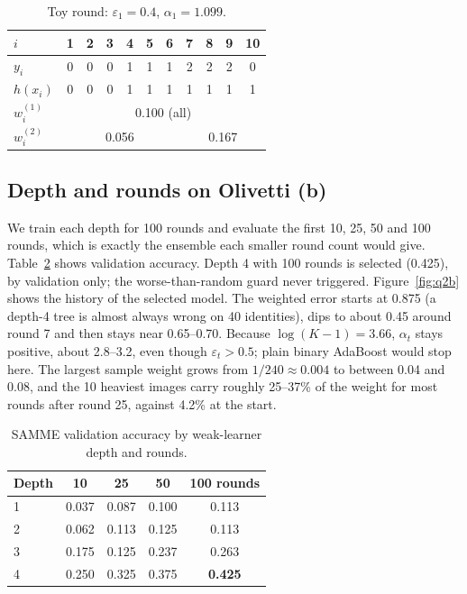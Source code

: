 \documentclass[10pt,twocolumn,letterpaper]{article}
\begin{document}
\begin{table}[t]
\centering\small
\setlength{\tabcolsep}{3.5pt}
\begin{tabular}{@{}lcccccccccc@{}}
\toprule
$i$ & 1&2&3&4&5&6&7&8&9&10\\
\midrule
$y_i$ & 0&0&0&1&1&1&2&2&2&0\\
$h(x_i)$ & 0&0&0&1&1&1&1&1&1&1\\
$w^{(1)}_i$ & \multicolumn{10}{c}{0.100 (all)}\\
$w^{(2)}_i$ & \multicolumn{6}{c}{0.056} & \multicolumn{4}{c}{0.167}\\
\bottomrule
\end{tabular}
\caption{Toy round: $\varepsilon_1=0.4$, $\alpha_1=1.099$.}
\label{tab:toy}
\end{table}

\subsection{Depth and rounds on Olivetti (b)}
We train each depth for 100 rounds and evaluate the first 10, 25, 50 and 100 rounds, which is exactly the ensemble each smaller round count would give. Table~\ref{tab:bgrid} shows validation accuracy. Depth 4 with 100 rounds is selected (0.425), by validation only; the worse-than-random guard never triggered. Figure~\ref{fig:q2b} shows the history of the selected model. The weighted error starts at 0.875 (a depth-4 tree is almost always wrong on 40 identities), dips to about 0.45 around round 7 and then stays near 0.65--0.70. Because $\log(K{-}1)=3.66$, $\alpha_t$ stays positive, about 2.8--3.2, even though $\varepsilon_t>0.5$; plain binary AdaBoost would stop here. The largest sample weight grows from $1/240\approx0.004$ to between 0.04 and 0.08, and the 10 heaviest images carry roughly 25--37\% of the weight for most rounds after round 25, against 4.2\% at the start.

\begin{table}[t]
\centering\small
\begin{tabular}{@{}lcccc@{}}
\toprule
Depth & 10 & 25 & 50 & 100 rounds\\
\midrule
1 & 0.037 & 0.087 & 0.100 & 0.113\\
2 & 0.062 & 0.113 & 0.125 & 0.113\\
3 & 0.175 & 0.125 & 0.237 & 0.263\\
4 & 0.250 & 0.325 & 0.375 & \textbf{0.425}\\
\bottomrule
\end{tabular}
\caption{SAMME validation accuracy by weak-learner depth and rounds.}
\label{tab:bgrid}
\end{table}
\end{document}
